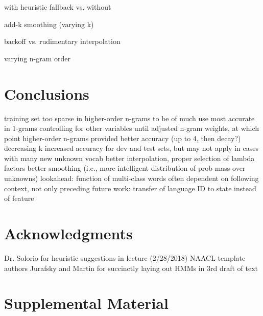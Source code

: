\documentclass[11pt,a4paper]{article}
\begin{document}
with heuristic fallback vs. without

add-k smoothing (varying k)

backoff vs. rudimentary interpolation

varying n-gram order

\section{Conclusions}

training set too sparse in higher-order n-grams to be of much use
most accurate in 1-grams controlling for other variables until adjusted n-gram weights, at which point higher-order n-grams provided better accuracy (up to 4, then decay?)
decreasing k increased accuracy for dev and test sets, but may not apply in cases with many new unknown vocab
better interpolation, proper selection of lambda factors
better smoothing (i.e., more intelligent distribution of prob mass over unknowns)
lookahead: function of multi-class words often dependent on following context, not only preceding
future work: transfer of language ID to state instead of feature

\section*{Acknowledgments}

Dr. Solorio for heuristic suggestions in lecture (2/28/2018)
NAACL template authors
Jurafsky and Martin for succinctly laying out HMMs in 3rd draft of text




\appendix

\section{Supplemental Material}
\label{sec:supplemental}
\end{document}
